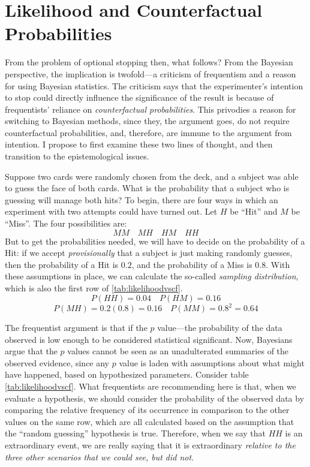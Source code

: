\hypertarget{likelihood-and-counterfactual-probabilities}{%
\section{Likelihood and Counterfactual
Probabilities}\label{likelihood-and-counterfactual-probabilities}}

From the problem of optional stopping then, what follows? From the
Bayesian perspective, the implication is twofold---a criticism of frequentism and a reason for using Bayesian statistics. The criticism says that the
experimenter's intention to stop could directly influence the
significance of the result is because of frequentists' reliance on
\emph{counterfactual probabilities}. This privodies a reason for switching to Bayesian methods, since they, the argument goes, do not require counterfactual probabilities, and, therefore, are immune to the argument from intention. I propose to first examine these two lines of thought, and then transition to the epistemological issues.

Suppose two cards were randomly chosen from the deck, and a subject was able to guess the face of both cards. What is the probability that a subject who is guessing will manage  both hits? To begin, there are four ways in which an experiment with
two attempts could have turned out. Let \(H\) be ``Hit'' and \(M\) be
``Miss''. The four possibilities are: \[MM \quad MH \quad HM \quad HH\] But
to get the probabilities needed, we will have to decide on the probability of a Hit: if we accept \emph{provisionally} that a subject is just making randomly guesses, then the probability of a Hit is $0.2$, and the probability of a Miss is $0.8$. With these assumptions in place, we can calculate the so-called \emph{sampling distribution}, which is also the first row of \ref{tab:likelihoodvscf}. 
\[P(H  H)=0.04 \quad P(H  M)=0.16  \]
\[P(M H)=0.2(0.8)=0.16 \quad P(M M)=0.8^2=0.64 \]

The frequentist argument is that if the $p$ value---the probability of the data observed is low enough to be considered statistical significant. Now, Bayesians argue that the $p$ values cannot be
seen as an unadulterated summaries of the observed evidence, since any $p$ value is laden with assumptions about what might have happened, based on hypothesized parameters. Consider table \ref{tab:likelihoodvscf}. What frequentists are recommending here is that, when we evaluate a hypothesis, we should consider the probability of the observed data by comparing the relative frequency of its occurrence in comparison to the other values on  the same row, which are all calculated based on the assumption that the ``random guessing'' hypothesis is true. Therefore, when we say that $HH$ is an extraordinary event, we are really saying that it is extraordinary \emph{relative to the three other scenarios that we could see, but did not.}

